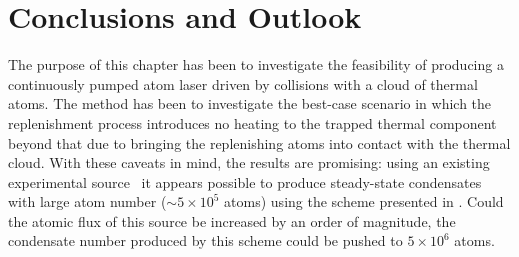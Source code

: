 




\section{Conclusions and Outlook}

The purpose of this chapter has been to investigate the feasibility of producing a continuously pumped atom laser driven by  collisions with a cloud of thermal atoms.  The method has been to investigate the best-case scenario in which the replenishment process introduces no heating to the trapped thermal component beyond that due to bringing the replenishing atoms into contact with the thermal cloud.  With these caveats in mind, the results are promising: using an existing experimental source~\citep{Muller:2007} it appears possible to produce steady-state condensates with large atom number ($\sim 5\times 10^5$ atoms) using the scheme presented in .  Could the atomic flux of this source be increased by an order of magnitude, the condensate number produced by this scheme could be pushed to $5\times 10^6$ atoms.  

